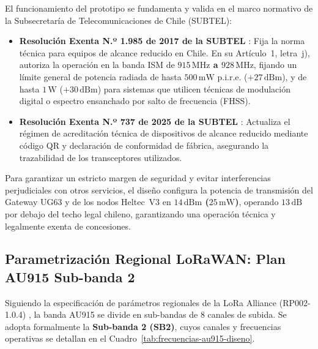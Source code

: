 \documentclass[12pt,oneside,openany,spanish,oldfontcommands]{memoir}
\begin{document}
El funcionamiento del prototipo se fundamenta y valida en el marco normativo de la Subsecretaría
de Telecomunicaciones de Chile (SUBTEL):
\begin{itemize}
    \item \textbf{Resolución Exenta N.º 1.985 de 2017 de la SUBTEL} \parencite{subtel2017}: Fija la
    norma técnica para equipos de alcance reducido en Chile. En su Artículo~1, letra~j), autoriza la
    operación en la banda ISM de \textbf{$915\,\text{MHz}$ a $928\,\text{MHz}$}, fijando un límite
    general de potencia radiada de hasta $500\,\text{mW}$ p.i.r.e. ($+27\,\text{dBm}$), y de hasta
    $1\,\text{W}$ ($+30\,\text{dBm}$) para sistemas que utilicen técnicas de modulación digital o
    espectro ensanchado por salto de frecuencia (FHSS).
    \item \textbf{Resolución Exenta N.º 737 de 2025 de la SUBTEL} \parencite{subtel737_2025}:
    Actualiza el régimen de acreditación técnica de dispositivos de alcance reducido mediante código
    QR y declaración de conformidad de fábrica, asegurando la trazabilidad de los transceptores
    utilizados.
\end{itemize}

Para garantizar un estricto margen de seguridad y evitar interferencias perjudiciales con otros
servicios, el diseño configura la potencia de transmisión del Gateway UG63 y de los nodos
Heltec~V3 en \textbf{$14\,\text{dBm}$ ($25\,\text{mW}$)}, operando $13\,\text{dB}$ por debajo del
techo legal chileno, garantizando una operación técnica y legalmente exenta de concesiones.

\subsection{Parametrización Regional LoRaWAN: Plan AU915 Sub-banda 2}

Siguiendo la especificación de parámetros regionales de la LoRa Alliance (RP002-1.0.4)
\parencite{lorawan_rp002}, la banda AU915 se divide en sub-bandas de 8 canales de subida. Se
adopta formalmente la \textbf{Sub-banda 2 (SB2)}, cuyos canales y frecuencias operativas se
detallan en el Cuadro~\ref{tab:frecuencias-au915-diseno}.
\end{document}
